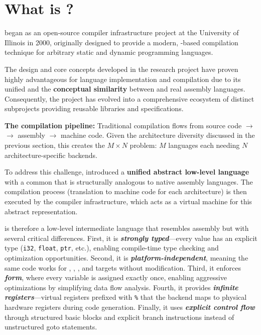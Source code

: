 \section{What is  ?}
 began as an open-source compiler infrastructure project at the University of Illinois in 2000, originally designed to provide a modern, -based compilation technique for arbitrary static and dynamic programming languages.

The design and core concepts developed in the  research project have proven highly advantageous for language implementation and compilation due to its unified  and the \textbf{conceptual similarity} between   and real assembly languages. Consequently, the project has evolved into a comprehensive ecosystem of distinct subprojects providing reusable libraries and  specifications.

\textbf{The compilation pipeline:} Traditional compilation flows from source code $\rightarrow$  $\rightarrow$ assembly $\rightarrow$ machine code. Given the architecture diversity discussed in the previous section, this creates the $M \times N$ problem: $M$ languages each needing $N$ architecture-specific backends.

To address this challenge,  introduced a \textbf{unified abstract low-level language} with a common  that is structurally analogous to native assembly languages. The compilation process (translation to machine code for each architecture) is then executed by the  compiler infrastructure, which acts as a virtual machine for this abstract representation.

  is therefore a low-level intermediate language that resembles assembly but with several critical differences. First, it is \textbf{\textit{strongly typed}}---every value has an explicit type (\texttt{i32}, \texttt{float}, \texttt{ptr}, etc.), enabling compile-time type checking and optimization opportunities. Second, it is \textbf{\textit{platform-independent}}, meaning the same  code works for , , , and  targets without modification. Third, it enforces \textbf{\textit{ form}}, where every variable is assigned exactly once, enabling aggressive optimizations by simplifying data flow analysis. Fourth, it provides \textbf{\textit{infinite registers}}---virtual registers prefixed with \texttt{\%} that the backend maps to physical hardware registers during code generation. Finally, it uses \textbf{\textit{explicit control flow}} through structured basic blocks and explicit branch instructions instead of unstructured goto statements.

